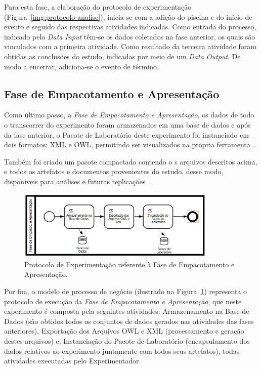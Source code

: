 Para esta fase, a elaboração do protocolo de experimentação (Figura~\ref{img:protocolo-analise}), inicia-se com a adição do piscina e do início de evento e seguido das respectivas atividades indicadas. Como entrada do processo, indicado pelo \textit{Data Input} têm-se os dados coletados na fase anterior, os quais são vinculados com a primeira atividade. Como resultado da terceira atividade foram obtidas as conclusões do estudo, indicadas por meio de um \textit{Data Output}. De modo a encerrar, adiciona-se o evento de término.


\subsection{Fase de Empacotamento e Apresentação}

Como último passo, a \textit{Fase de Empacotamento e Apresentação}, os dados de todo o transcorrer do experimento foram armazenados em uma base de dados e após da fase anterior, o Pacote de Laboratório deste experimento foi instanciado em dois formatos: XML e OWL, permitindo ser visualizados na própria ferramenta~\cite{d2012avaliaccao}.

Também foi criado um pacote compactado contendo o	s arquivos descritos acima, e todos os artefatos e documentos provenientes do estudo, desse modo, disponíveis para análises e futuras replicações~\cite{d2012avaliaccao}. 

\begin{figure}[!htb]
\centering
\includegraphics[width=0.85\textwidth]{images/protocolo-empacotamento.png}
\caption{Protocolo de Experimentação referente à Fase de Empacotamento e Apresentação.}
\label{img:protocolo-empacotamento}
\end{figure}

Por fim, o modelo de processo de negócio (ilustrado na Figura~\ref{img:protocolo-empacotamento}) representa o protocolo de execução da \textit{Fase de Empacotamento e Apresentação}, que neste experimento é composta pela seguintes atividades: Armazenamento na Base de Dados (são obtidos todos os conjuntos de dados gerados nas atividades das fases anteriores), Exportação dos Arquivos OWL e XML (processamento e geração destes arquivos) e, Instanciação do Pacote de Laboratório (encapsulamento dos dados relativos ao experimento juntamente com todos seus artefatos), todas atividades executadas pelo Experimentador.

